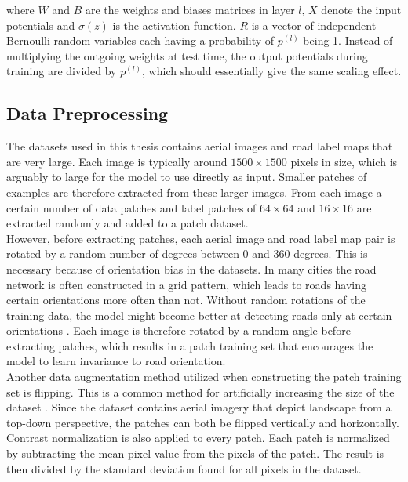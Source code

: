 \noindent where $W$ and $B$ are the weights and biases matrices in layer $l$, $X$ denote the input potentials and $\sigma(z)$ is the activation function. $R$ is a vector of independent Bernoulli random variables each having a probability of $p^{(l)}$ being 1. Instead of multiplying the outgoing weights at test time, the output potentials during training are divided by $p^{(l)}$, which should essentially give the same scaling effect.\\


\subsection{Data Preprocessing}
The datasets used in this thesis contains aerial images and road label maps that are very large. Each image is typically around $1500 \times 1500$ pixels in size, which is arguably to large for the model to use directly as input. Smaller patches of examples are therefore extracted from these larger images. From each image a certain number of data patches and label patches of $64 \times 64$ and $16 \times 16$ are extracted randomly and added to a patch dataset.\\

However, before extracting patches, each aerial image and road label map pair is rotated by a random number of degrees between 0 and 360 degrees. This is necessary because of orientation bias in the datasets. In many cities the road network is often constructed in a grid pattern, which leads to roads having certain orientations more often than not. Without random rotations of the training data, the model might become better at detecting roads only at certain orientations \citep{Mnih_roads_high_res_aerial_images}. Each image is therefore rotated by a random angle before extracting patches, which results in a patch training set that encourages the model to learn invariance to road orientation.\\

Another data augmentation method utilized when constructing the patch training set is flipping. This is a common method for artificially increasing the size of the dataset \citep{Krizhevsky_imagenet}. Since the dataset contains aerial imagery that depict landscape from a top-down perspective, the patches can both be flipped vertically and horizontally.\\

Contrast normalization is also applied to every patch. Each patch is normalized by subtracting the mean pixel value from the pixels of the patch. The result is then divided by the standard deviation found for all pixels in the dataset.\\

